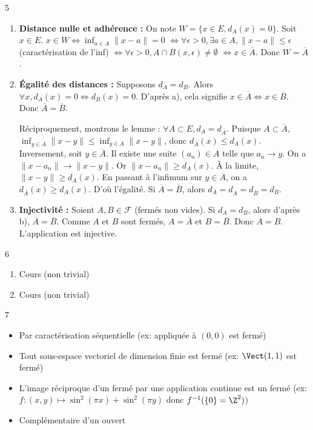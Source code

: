 \begin{correction}{5}
\begin{enumerate}
    \item \textbf{Distance nulle et adhérence :}
On note $W = \{x \in E, d_{A}(x) = 0\}$.
Soit $x \in E$.
$x \in W \iff \inf_{a \in A} \|x-a\| = 0$
$\iff \forall \epsilon > 0, \exists a \in A, \|x-a\| \le \epsilon$ (caractérisation de l'inf)
$\iff \forall \epsilon > 0, A \cap B(x, \epsilon) \neq \emptyset$
$\iff x \in \overline{A}$.
Donc $W = \overline{A}$.

    \item \textbf{Égalité des distances :}
Supposons $d_{A} = d_{B}$.
Alors $\forall x, d_{A}(x)=0 \iff d_{B}(x)=0$.
D'après a), cela signifie $x \in \overline{A} \iff x \in \overline{B}$. Donc $\overline{A} = \overline{B}$.

Réciproquement, montrons le lemme : $\forall A \subset E, d_{A} = d_{\overline{A}}$.
Puisque $A \subset \overline{A}$, $\inf_{y \in \overline{A}} \|x-y\| \le \inf_{y \in A} \|x-y\|$, donc $d_{\overline{A}}(x) \le d_{A}(x)$.
Inversement, soit $y \in \overline{A}$. Il existe une suite $(a_{n}) \in A$ telle que $a_{n} \to y$.
On a $\|x-a_{n}\| \to \|x-y\|$.
Or $\|x-a_{n}\| \ge d_{A}(x)$. À la limite, $\|x-y\| \ge d_{A}(x)$.
En passant à l'infimum sur $y \in \overline{A}$, on a $d_{\overline{A}}(x) \ge d_{A}(x)$.
D'où l'égalité.
Si $\overline{A} = \overline{B}$, alors $d_{A} = d_{\overline{A}} = d_{\overline{B}} = d_{B}$.

    \item \textbf{Injectivité :}
Soient $A, B \in \mathcal{F}$ (fermés non vides).
Si $d_{A} = d_{B}$, alors d'après b), $\overline{A} = \overline{B}$.
Comme $A$ et $B$ sont fermés, $A = \overline{A}$ et $B = \overline{B}$.
Donc $A = B$. L'application est injective.
\end{enumerate}
\end{correction}

\begin{correction}{6}
\begin{enumerate}
    \item Cours (non trivial)
    \item Cours (non trivial)
\end{enumerate}
\end{correction}

\begin{correction}{7}
\begin{itemize}
    \item Par caractérisation séquentielle (ex: appliquée à $(0,0)$ est fermé)
    \item Tout sous-espace vectoriel de dimension finie est fermé (ex: $\Vect(1,1)$ est fermé)
    \item L'image réciproque d'un fermé par une application continue est un fermé (ex: $f : (x,y) \mapsto \sin^2(\pi x) + \sin^2(\pi y)$ donc $f^{-1}(\{0\} = \Z^2)$)
    \item Complémentaire d'un ouvert
\end{itemize}
\end{correction}

